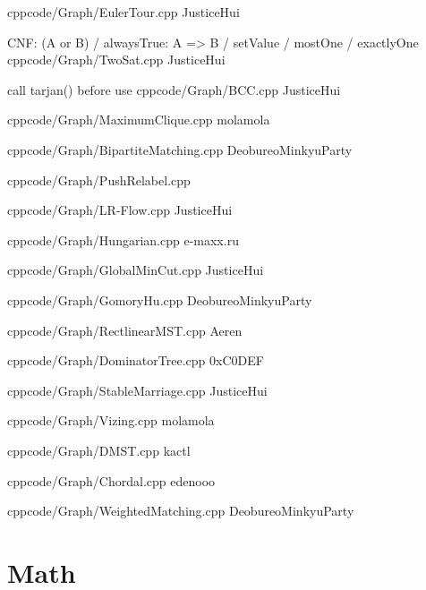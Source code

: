 \documentclass[landscape, 8pt, a4paper, oneside, twocolumn]{extarticle}
\begin{document}
{}{}
{cpp}{code/Graph/EulerTour.cpp}
{JusticeHui}

{CNF: (A or B) / alwaysTrue: A => B / setValue / mostOne / exactlyOne}{}
{cpp}{code/Graph/TwoSat.cpp}
{JusticeHui}

{call tarjan() before use}{}
{cpp}{code/Graph/BCC.cpp}
{JusticeHui}

{}{}
{cpp}{code/Graph/MaximumClique.cpp}
{molamola}

{}{}
{cpp}{code/Graph/BipartiteMatching.cpp}
{DeobureoMinkyuParty}



{}{}
{cpp}{code/Graph/PushRelabel.cpp}
{}

{}{}
{cpp}{code/Graph/LR-Flow.cpp}
{JusticeHui}

{}{}
{cpp}{code/Graph/Hungarian.cpp}
{e-maxx.ru}

{}{}
{cpp}{code/Graph/GlobalMinCut.cpp}
{JusticeHui}

{}{}
{cpp}{code/Graph/GomoryHu.cpp}
{DeobureoMinkyuParty}

{}{}
{cpp}{code/Graph/RectlinearMST.cpp}
{Aeren}

{}{}
{cpp}{code/Graph/DominatorTree.cpp}
{0xC0DEF}

{}{}
{cpp}{code/Graph/StableMarriage.cpp}
{JusticeHui}

{}{}
{cpp}{code/Graph/Vizing.cpp}
{molamola}

{}{}
{cpp}{code/Graph/DMST.cpp}
{kactl}

{}{}
{cpp}{code/Graph/Chordal.cpp}
{edenooo}


{}{}
{cpp}{code/Graph/WeightedMatching.cpp}
{DeobureoMinkyuParty}

\section{Math}
\end{document}
